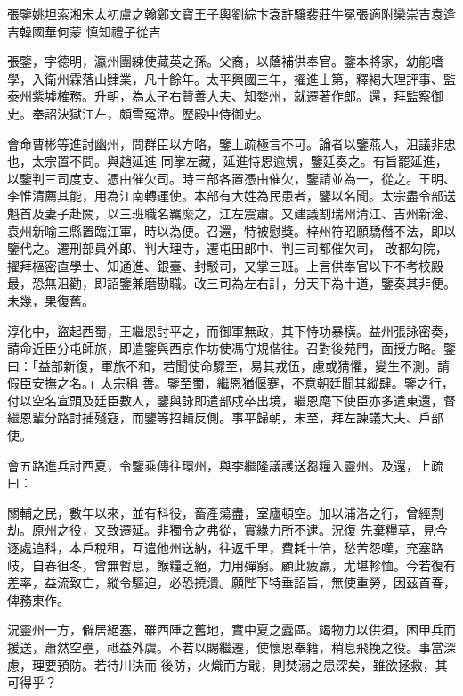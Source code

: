 
\begin{pinyinscope}

 張鑒姚坦索湘宋太初盧之翰鄭文寶王子輿劉綜卞袞許驤裴莊牛冕張適附欒崇吉袁逢吉韓國華何蒙
 慎知禮子從吉



 張鑒，字德明，瀛州團練使藏英之孫。父裔，以蔭補供奉官。鑒本將家，幼能嗜學，入衛州霖落山肄業，凡十餘年。太平興國三年，擢進士第，釋褐大理評事、監泰州紫墟榷務。升朝，為太子右贊善大夫、知婺州，就遷著作郎。還，拜監察御史。奉詔決獄江左，頗雪冤滯。歷殿中侍御史。



 會命曹彬等進討幽州，問群臣以方略，鑒上疏極言不可。論者以鑒燕人，沮議非忠也，太宗置不問。與趙延進
 同掌左藏，延進恃恩逾規，鑒廷奏之。有旨罷延進，以鑒判三司度支、憑由催欠司。時三部各置憑由催欠，鑒請並為一，從之。王明、李惟清薦其能，用為江南轉運使。本部有大姓為民患者，鑒以名聞。太宗盡令部送魁首及妻子赴闕，以三班職名羈縻之，江左震肅。又建議割瑞州清江、吉州新淦、袁州新喻三縣置臨江軍，時以為便。召還，特被慰獎。梓州符昭願驕僭不法，即以鑒代之。遷刑部員外郎、判大理寺，遷屯田郎中、判三司都催欠司，
 改都勾院，擢拜樞密直學士、知通進、銀臺、封駁司，又掌三班。上言供奉官以下不考校殿最，恐無沮勸，即詔鑒兼磨勘職。改三司為左右計，分天下為十道，鑒奏其非便。未幾，果復舊。



 淳化中，盜起西蜀，王繼恩討平之，而御軍無政，其下恃功暴橫。益州張詠密奏，請命近臣分屯師旅，即遣鑒與西京作坊使馮守規偕往。召對後苑門，面授方略。鑒曰：「益部新復，軍旅不和，若聞使命驟至，易其戎伍，慮或猜懼，變生不測。請假臣安撫之名。」太宗稱
 善。鑒至蜀，繼恩猶偃蹇，不意朝廷聞其縱肆。鑒之行，付以空名宣頭及廷臣數人，鑒與詠即遣部戍卒出境，繼恩麾下使臣亦多遣東還，督繼恩輩分路討捕殘寇，而鑒等招輯反側。事平歸朝，未至，拜左諫議大夫、戶部使。



 會五路進兵討西夏，令鑒乘傳往環州，與李繼隆議護送芻糧入靈州。及還，上疏曰：



 關輔之民，數年以來，並有科役，畜產蕩盡，室廬頓空。加以浦洛之行，曾經剽劫。原州之役，又致遷延。非獨令之弗從，實緣力所不逮。況復
 先棄糧草，見今逐處追科，本戶稅租，互遣他州送納，往返千里，費耗十倍，愁苦怨嘆，充塞路岐，自春徂冬，曾無暫息，餱糧乏絕，力用殫窮。顧此疲羸，尤堪軫恤。今若復有差率，益流致亡，縱令驅迫，必恐撓潰。願陛下特垂詔旨，無使重勞，因茲首春，俾務東作。



 況靈州一方，僻居絕塞，雖西陲之舊地，實中夏之蠹區。竭物力以供須，困甲兵而援送，蕭然空壘，祗益外虞。不若以賜繼遷，使懷恩奉籍，稍息飛挽之役。事當深慮，理要預防。若待川決而
 後防，火熾而方戢，則焚溺之患深矣，雖欲拯救，其可得乎？




\end{pinyinscope}
